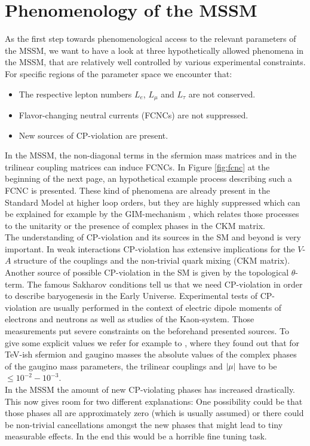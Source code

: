 \section{Phenomenology of the MSSM}
As the first step towards  phenomenological access to the relevant parameters of the MSSM, we want to have a look at three hypothetically allowed phenomena in the MSSM, that are relatively well controlled by various experimental constraints. For specific regions of the parameter space we encounter that:

\begin{itemize}
	\item The respective lepton numbers $L_{e}$, $L_{\mu}$ and $L_{\tau}$ are not conserved.
	\item Flavor-changing neutral currents (FCNCs) are not suppressed.
	\item New sources of CP-violation are present.
\end{itemize}

\noindent In the MSSM, the non-diagonal terms in the sfermion mass matrices and in the trilinear coupling matrices can induce FCNCs.  In Figure \ref{fig:fcnc} at the beginning of the next page, an hypothetical example process describing such a FCNC is presented. These kind of phenomena are already present in the Standard Model at higher loop orders, but they are highly suppressed which can be explained for example by the GIM-mechanism \cite{GIM1970}, which relates those processes to the unitarity or the presence of complex phases in the CKM matrix. \\
The understanding of CP-violation and its sources in the SM and beyond is very important. In weak interactions CP-violation has extensive implications for the $V$-$A$ structure of the couplings and the non-trivial quark mixing (CKM matrix). Another source of possible CP-violation in the SM is given by the topological $\theta$-term. The famous Sakharov conditions tell us that we need CP-violation in order to describe baryogenesis in the Early Universe. Experimental tests of CP-violation are usually performed in the context of electric dipole moments of electrons and neutrons as well as studies of the Kaon-system. Those measurements put severe constraints on the beforehand presented sources. To give some explicit values we refer for example to \cite{Fischler1992}, where they found out that for TeV-ish sfermion and gaugino masses the absolute values of the complex phases of the gaugino mass parameters, the trilinear couplings and $\abs{\mu}$  have to be $\leq 10^{-2} - 10^{-3}$.\\
\noindent
In the MSSM the amount of new CP-violating phases has increased drastically. This now gives room for two different explanations: One possibility could be that those phases all are approximately zero (which is usually assumed) or there could be non-trivial cancellations amongst the new phases that might lead to tiny measurable effects. In the end this would be a horrible fine tuning task.

